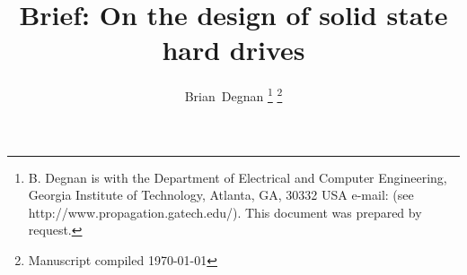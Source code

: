 \documentclass[jounal,letterpaper]{IEEEtran}
\begin{document}
%
\title{Brief: On the design of solid state hard drives}
%
%
%

\author{{Brian~Degnan}%
\thanks{B. Degnan is with the Department
of Electrical and Computer Engineering, Georgia Institute of Technology, Atlanta,
GA, 30332 USA e-mail: (see http://www.propagation.gatech.edu/).  This document was prepared by request.}%
\thanks{Manuscript compiled \today}}
% 
%




\end{document}
